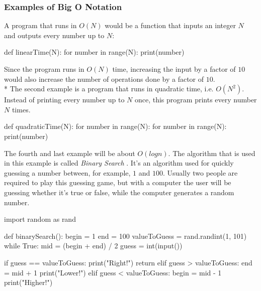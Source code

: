 \documentclass[main.tex]{subfiles}
\begin{document}
\subsubsection{Examples of Big O Notation}

A program that runs in $O(N)$ would be a function that inputs an integer $N$ and outputs every number up to $N$:
\begin{python}
def linearTime(N):
    for number in range(N):
        print(number)
\end{python}

Since the program runs in $O(N)$ time, increasing the input by a factor of $10$ would also increase the number of operations done by a factor of $10$.
\newline
\\*
The second example is a program that runs in quadratic time, i.e. $O(N^{2})$. Instead of printing every number up to $N$ once, this program prints every number $N$ times.

\begin{python}
    def quadraticTime(N):
        for number in range(N):
            for number in range(N):
                print(number)
\end{python}

\vspace{5mm}

The fourth and last example will be about $O(log n)$. The algorithm that is used in this example is called \textit{Binary Search} \cite{binary_search}. It's an algorithm used for quickly guessing a number between, for example, $1$ and $100$. Usually two people are required to play this guessing game, but with a computer the user will be guessing whether it's true or false, while the computer generates a random number.

\begin{python}
    import random as rand

    def binarySearch():
        begin = 1
        end = 100
        valueToGuess = rand.randint(1, 101)
        while True:
            mid = (begin + end) / 2
            guess = int(input())

            if guess == valueToGuess:
                print("Right!")
                return
            elif guess > valueToGuess:
                end = mid + 1
                print("Lower!")
            elif guess < valueToGuess:
                begin = mid - 1
                print("Higher!")                

\end{python}

\end{document}

